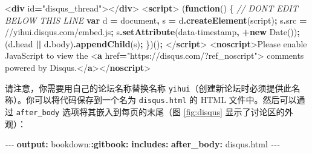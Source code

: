 \documentclass[
  12pt,
]{krantz}
\newenvironment{Shaded}{\begin{snugshade}}{\end{snugshade}}
\newcommand{\AttributeTok}[1]{\textcolor[rgb]{0.13,0.29,0.53}{#1}}
\newcommand{\BuiltInTok}[1]{#1}
\newcommand{\CommentTok}[1]{\textcolor[rgb]{0.56,0.35,0.01}{\textit{#1}}}
\newcommand{\DataTypeTok}[1]{\textcolor[rgb]{0.13,0.29,0.53}{#1}}
\newcommand{\FunctionTok}[1]{\textcolor[rgb]{0.13,0.29,0.53}{\textbf{#1}}}
\newcommand{\KeywordTok}[1]{\textcolor[rgb]{0.13,0.29,0.53}{\textbf{#1}}}
\newcommand{\NormalTok}[1]{#1}
\newcommand{\OperatorTok}[1]{\textcolor[rgb]{0.81,0.36,0.00}{\textbf{#1}}}
\newcommand{\OtherTok}[1]{\textcolor[rgb]{0.56,0.35,0.01}{#1}}
\newcommand{\PreprocessorTok}[1]{\textcolor[rgb]{0.56,0.35,0.01}{\textit{#1}}}
\newcommand{\StringTok}[1]{\textcolor[rgb]{0.31,0.60,0.02}{#1}}
\theoremstyle{definition}
\theoremstyle{definition}
\theoremstyle{definition}
\theoremstyle{definition}
\theoremstyle{remark}
\begin{document}
\begin{Shaded}
\begin{Highlighting}[]
\DataTypeTok{\textless{}}\KeywordTok{div}\OtherTok{ id}\OperatorTok{=}\StringTok{"disqus\_thread"}\DataTypeTok{\textgreater{}\textless{}/}\KeywordTok{div}\DataTypeTok{\textgreater{}}
\DataTypeTok{\textless{}}\KeywordTok{script}\DataTypeTok{\textgreater{}}
\NormalTok{(}\KeywordTok{function}\NormalTok{() \{ }\CommentTok{// DON\textquotesingle{}T EDIT BELOW THIS LINE}
\KeywordTok{var}\NormalTok{ d }\OperatorTok{=} \BuiltInTok{document}\OperatorTok{,}\NormalTok{ s }\OperatorTok{=}\NormalTok{ d}\OperatorTok{.}\FunctionTok{createElement}\NormalTok{(}\StringTok{\textquotesingle{}script\textquotesingle{}}\NormalTok{)}\OperatorTok{;}
\NormalTok{s}\OperatorTok{.}\AttributeTok{src} \OperatorTok{=} \StringTok{\textquotesingle{}//yihui.disqus.com/embed.js\textquotesingle{}}\OperatorTok{;}
\NormalTok{s}\OperatorTok{.}\FunctionTok{setAttribute}\NormalTok{(}\StringTok{\textquotesingle{}data{-}timestamp\textquotesingle{}}\OperatorTok{,} \OperatorTok{+}\KeywordTok{new} \BuiltInTok{Date}\NormalTok{())}\OperatorTok{;}
\NormalTok{(d}\OperatorTok{.}\AttributeTok{head} \OperatorTok{||}\NormalTok{ d}\OperatorTok{.}\AttributeTok{body}\NormalTok{)}\OperatorTok{.}\FunctionTok{appendChild}\NormalTok{(s)}\OperatorTok{;}
\NormalTok{\})()}\OperatorTok{;}
\DataTypeTok{\textless{}/}\KeywordTok{script}\DataTypeTok{\textgreater{}}
\DataTypeTok{\textless{}}\KeywordTok{noscript}\DataTypeTok{\textgreater{}}\NormalTok{Please enable JavaScript to view the}
\DataTypeTok{\textless{}}\KeywordTok{a}\OtherTok{ href}\OperatorTok{=}\StringTok{"https://disqus.com/?ref\_noscript"}\DataTypeTok{\textgreater{}}
\NormalTok{  comments powered by Disqus.}\DataTypeTok{\textless{}/}\KeywordTok{a}\DataTypeTok{\textgreater{}\textless{}/}\KeywordTok{noscript}\DataTypeTok{\textgreater{}}
\end{Highlighting}
\end{Shaded}

请注意，你需要用自己的论坛名称替换名称 \texttt{yihui}（创建新论坛时必须提供此名称）。你可以将代码保存到一个名为 \texttt{disqus.html} 的 HTML 文件中。然后可以通过 \texttt{after\_body} 选项将其嵌入到每页的末尾（图 \ref{fig:disqus} 显示了讨论区的外观）：

\begin{Shaded}
\begin{Highlighting}[]
\PreprocessorTok{{-}{-}{-}}
\FunctionTok{output}\KeywordTok{:}
\AttributeTok{  bookdown:}\FunctionTok{:gitbook}\KeywordTok{:}
\AttributeTok{    }\FunctionTok{includes}\KeywordTok{:}
\AttributeTok{      }\FunctionTok{after\_body}\KeywordTok{:}\AttributeTok{ disqus.html}
\PreprocessorTok{{-}{-}{-}}
\end{Highlighting}
\end{Shaded}
\end{document}
